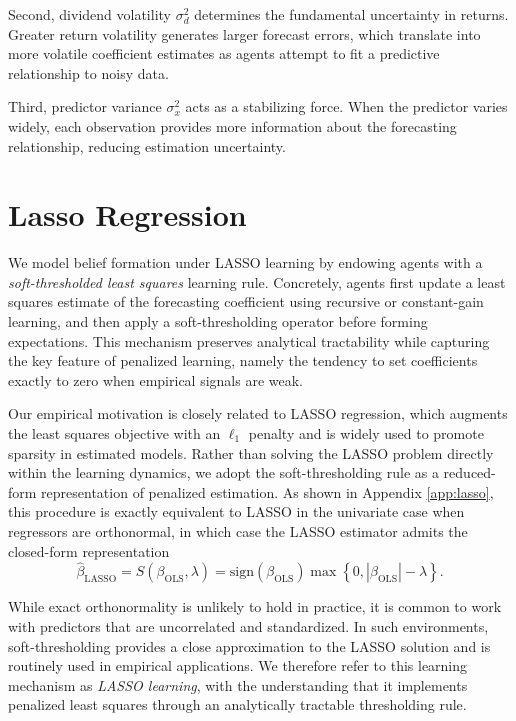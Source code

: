 \documentclass[11pt]{article}
\begin{document}
Second, dividend volatility $\sigma_d^2$ determines the fundamental uncertainty in returns. Greater return volatility generates larger forecast errors, which translate into more volatile coefficient estimates as agents attempt to fit a predictive relationship to noisy data.

Third, predictor variance $\sigma^2_x$ acts as a stabilizing force. When the predictor varies widely, each observation provides more information about the forecasting relationship, reducing estimation uncertainty. 
\section{Lasso Regression}\label{sec:lasso}

We model belief formation under LASSO learning by endowing agents with a \emph{soft-thresholded least squares} learning rule. Concretely, agents first update a least squares estimate of the forecasting coefficient using recursive or constant-gain learning, and then apply a soft-thresholding operator before forming expectations. This mechanism preserves analytical tractability while capturing the key feature of penalized learning, namely the tendency to set coefficients exactly to zero when empirical signals are weak.

Our empirical motivation is closely related to LASSO regression, which augments the least squares objective with an $\ell_1$ penalty and is widely used to promote sparsity in estimated models. 
Rather than solving the LASSO problem directly within the learning dynamics, we adopt the soft-thresholding rule as a reduced-form representation of penalized estimation. 
As shown in Appendix \ref{app:lasso}, this procedure is exactly equivalent to LASSO in the univariate case when regressors are orthonormal, in which case the LASSO estimator admits the closed-form representation
\begin{equation}\label{eq:lasso_from_ols}
\hat{\beta}_{\text{LASSO}}
=
S(\beta_{\text{OLS}},\lambda)
=
\mathrm{sign}(\beta_{\text{OLS}})
\max\!\left\{0,|\beta_{\text{OLS}}|-\lambda\right\}.
\end{equation}

While exact orthonormality is unlikely to hold in practice, it is common to work with predictors that are uncorrelated and standardized. In such environments, soft-thresholding provides a close approximation to the LASSO solution and is routinely used in empirical applications. We therefore refer to this learning mechanism as \emph{LASSO learning}, with the understanding that it implements penalized least squares through an analytically tractable thresholding rule.
\end{document}
